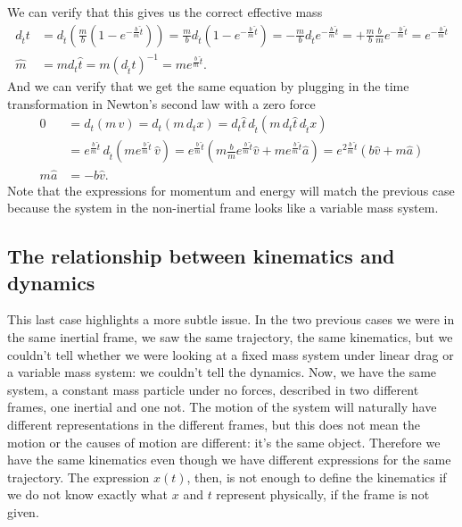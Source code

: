 We can verify that this gives us the correct effective mass
\begin{equation}
	\begin{aligned}
	d_{\hat{t}} t  &=d_{\hat{t}} \left( \frac{m}{b} (1-e^{-\frac{b}{m}\hat{t}}) \right) =\frac{m}{b} d_{\hat{t}} (1-e^{-\frac{b}{m}\hat{t}}) = - \frac{m}{b} d_{\hat{t}} e^{-\frac{b}{m}\hat{t}} = + \frac{m}{b} \frac{b}{m} e^{-\frac{b}{m}\hat{t}} = e^{-\frac{b}{m}\hat{t}} \\
	\hat{m} &= m d_t \hat{t} = m (d_{\hat{t}} t)^{-1} = m e^{\frac{b}{m}\hat{t}}.
	\end{aligned}
\end{equation}
And we can verify that we get the same equation by plugging in the time transformation in Newton's second law with a zero force
\begin{equation}
	\begin{aligned}
		0 &= d_t  (m \, v) = d_t  (m \, d_t x) = d_t \hat{t} \, d_{\hat{t}}  (m \, d_t \hat{t} \, d_{\hat{t}} x) \\ &= e^{\frac{b}{m}\hat{t}} \, d_{\hat{t}}  (m e^{\frac{b}{m}\hat{t}} \, \hat{v}) = e^{\frac{b}{m}\hat{t}} \left( m \frac{b}{m} e^{\frac{b}{m}\hat{t}} \hat{v} + m e^{\frac{b}{m}\hat{t}} \hat{a} \right)  = e^{2\frac{b}{m}\hat{t}} \left( b \hat{v} + m \hat{a} \right) \\
		m \hat{a} &= - b \hat{v}.
	\end{aligned}
\end{equation}
Note that the expressions for momentum and energy will match the previous case because the system in the non-inertial frame looks like a variable mass system.

\subsection{The relationship between kinematics and dynamics}

This last case highlights a more subtle issue. In the two previous cases we were in the same inertial frame, we saw the same trajectory, the same kinematics, but we couldn't tell whether we were looking at a fixed mass system under linear drag or a variable mass system: we couldn't tell the dynamics. Now, we have the same system, a constant mass particle under no forces, described in two different frames, one inertial and one not. The motion of the system will naturally have different representations in the different frames, but this does not mean the motion or the causes of motion are different: it's the same object. Therefore we have the same kinematics even though we have different expressions for the same trajectory. The expression $x(t)$, then, is not enough to define the kinematics if we do not know exactly what $x$ and $t$ represent physically, if the frame is not given.

